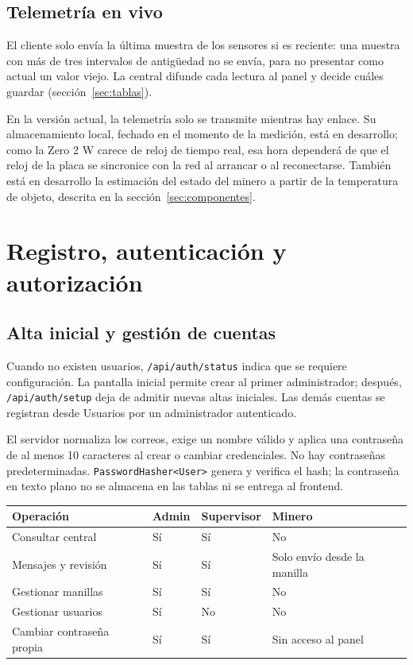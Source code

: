 \documentclass[10pt,a4paper]{article}
\newcommand{\code}[1]{{\small\urlstyle{tt}\nolinkurl{#1}}}
\newcommand{\newsection}[1]{\clearpage\section{#1}}
\begin{document}
\subsection{Telemetría en vivo}
\label{sec:telemetria}
El cliente solo envía la última muestra de los sensores si es reciente: una muestra con más de tres intervalos de antigüedad no se envía, para no presentar como actual un valor viejo. La central difunde cada lectura al panel y decide cuáles guardar (sección~\ref{sec:tablas}).

En la versión actual, la telemetría solo se transmite mientras hay enlace. Su almacenamiento local, fechado en el momento de la medición, está en desarrollo; como la Zero 2 W carece de reloj de tiempo real, esa hora dependerá de que el reloj de la placa se sincronice con la red al arrancar o al reconectarse. También está en desarrollo la estimación del estado del minero a partir de la temperatura de objeto, descrita en la sección~\ref{sec:componentes}.

\newsection{Registro, autenticación y autorización}
\label{sec:auth}
\subsection{Alta inicial y gestión de cuentas}
Cuando no existen usuarios, \code{/api/auth/status} indica que se requiere configuración. La pantalla inicial permite crear al primer administrador; después, \code{/api/auth/setup} deja de admitir nuevas altas iniciales. Las demás cuentas se registran desde Usuarios por un administrador autenticado.

El servidor normaliza los correos, exige un nombre válido y aplica una contraseña de al menos 10 caracteres al crear o cambiar credenciales. No hay contraseñas predeterminadas. \code{PasswordHasher<User>} genera y verifica el hash; la contraseña en texto plano no se almacena en las tablas ni se entrega al frontend.

\label{tab:roles}
\begin{tabularx}{\linewidth}{@{}P{28mm}YYY@{}}
\toprule\textbf{Operación} & \textbf{Admin} & \textbf{Supervisor} & \textbf{Minero}\\\midrule
Consultar central & Sí & Sí & No\\
Mensajes y revisión & Sí & Sí & Solo envío desde la manilla\\
Gestionar manillas & Sí & Sí & No\\
Gestionar usuarios & Sí & No & No\\
Cambiar contraseña propia & Sí & Sí & Sin acceso al panel\\\bottomrule
\end{tabularx}
\end{document}

